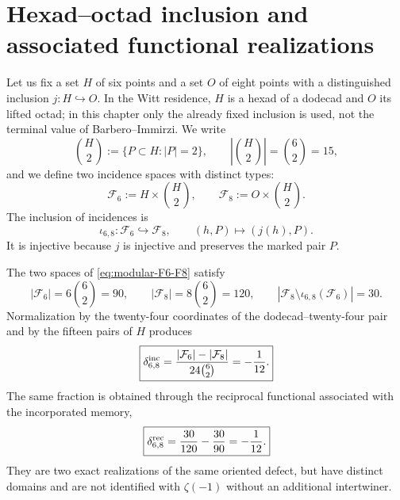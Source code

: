 \label{ch:modular}

\section{Hexad--octad inclusion and associated functional realizations}

Let us fix a set \(H\) of six points and a set \(O\) of eight
points with a distinguished inclusion \(j:H\hookrightarrow O\). In the
Witt residence, \(H\) is a hexad of a dodecad and \(O\) its lifted octad;
in this chapter only the already fixed inclusion is used, not the
terminal value of Barbero--Immirzi. We write
\begin{equation}
\label{eq:modular-pairs-H}
\binom H2:=\{P\subset H:|P|=2\},
\qquad \left|\binom H2\right|=\binom62=15,
\end{equation}
and we define two incidence spaces with distinct types:
\begin{equation}
\label{eq:modular-F6-F8}
\mathcal F_6:=H\times\binom H2,
\qquad
\mathcal F_8:=O\times\binom H2.
\end{equation}
The inclusion of incidences is
\begin{equation}
\label{eq:modular-iota68}
\iota_{6,8}:\mathcal F_6\hookrightarrow\mathcal F_8,
\qquad
(h,P)\longmapsto(j(h),P).
\end{equation}
It is injective because \(j\) is injective and preserves the marked pair \(P\).

\begin{theorem}
\label{thm:modular-incidence-90-120}
The two spaces of \cref{eq:modular-F6-F8} satisfy
\begin{equation}
\label{eq:modular-counts-90-120}
|\mathcal F_6|=6\binom62=90,
\qquad
|\mathcal F_8|=8\binom62=120,
\qquad
|\mathcal F_8\setminus\iota_{6,8}(\mathcal F_6)|=30.
\end{equation}
Normalization by the twenty-four coordinates of the
dodecad--twenty-four pair and by the fifteen pairs of \(H\) produces
\begin{equation}
\label{eq:modular-incidence-defect}
\boxed{
\delta_{6,8}^{\rm inc}
=\frac{|\mathcal F_6|-|\mathcal F_8|}
{24\binom62}=-\frac1{12}.}
\end{equation}
The same fraction is obtained through the reciprocal functional associated
with the incorporated memory,
\begin{equation}
\label{eq:modular-reciprocal-defect}
\boxed{
\delta_{6,8}^{\rm rec}
=\frac{30}{120}-\frac{30}{90}=-\frac1{12}.}
\end{equation}
They are two exact realizations of the same oriented defect, but have
distinct domains and are not identified with \(\zeta(-1)\) without an
additional intertwiner.
\end{theorem}

